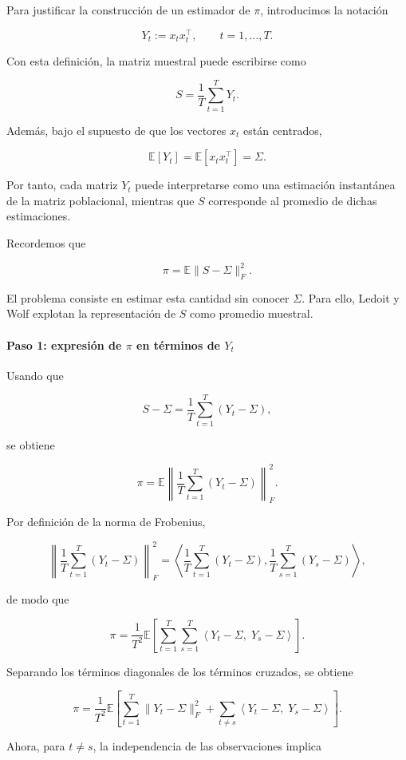\documentclass[letterpaper,12pt,oneside]{book}
\begin{document}
Para justificar la construcción de un estimador de $\pi$, introducimos la notación

\[
Y_t := x_t x_t^\top,
\qquad t=1,\dots,T.
\]

Con esta definición, la matriz muestral puede escribirse como

\[
S = \frac{1}{T}\sum_{t=1}^{T} Y_t.
\]

Además, bajo el supuesto de que los vectores $x_t$ están centrados,

\[
\mathbb{E}[Y_t] = \mathbb{E}[x_t x_t^\top] = \Sigma.
\]

Por tanto, cada matriz $Y_t$ puede interpretarse como una estimación instantánea de la matriz poblacional, mientras que $S$ corresponde al promedio de dichas estimaciones.

Recordemos que

\[
\pi = \mathbb{E}\|S-\Sigma\|_F^2.
\]

El problema consiste en estimar esta cantidad sin conocer $\Sigma$. Para ello, Ledoit y Wolf explotan la representación de $S$ como promedio muestral.

\paragraph{Paso 1: expresión de $\pi$ en términos de $Y_t$}

Usando que

\[
S-\Sigma
=
\frac{1}{T}\sum_{t=1}^{T}(Y_t-\Sigma),
\]

se obtiene

\[
\pi
=
\mathbb{E}\left\|
\frac{1}{T}\sum_{t=1}^{T}(Y_t-\Sigma)
\right\|_F^2.
\]

Por definición de la norma de Frobenius,

\[
\left\|
\frac{1}{T}\sum_{t=1}^{T}(Y_t-\Sigma)
\right\|_F^2
=
\left\langle
\frac{1}{T}\sum_{t=1}^{T}(Y_t-\Sigma),
\frac{1}{T}\sum_{s=1}^{T}(Y_s-\Sigma)
\right\rangle,
\]

de modo que

\[
\pi
=
\frac{1}{T^2}
\mathbb{E}
\left[
\sum_{t=1}^{T}\sum_{s=1}^{T}
\left\langle Y_t-\Sigma,\; Y_s-\Sigma\right\rangle
\right].
\]

Separando los términos diagonales de los términos cruzados, se obtiene

\[
\pi
=
\frac{1}{T^2}
\mathbb{E}
\left[
\sum_{t=1}^{T}\|Y_t-\Sigma\|_F^2
+
\sum_{t\neq s}
\left\langle Y_t-\Sigma,\; Y_s-\Sigma\right\rangle
\right].
\]

Ahora, para $t\neq s$, la independencia de las observaciones implica
\end{document}
